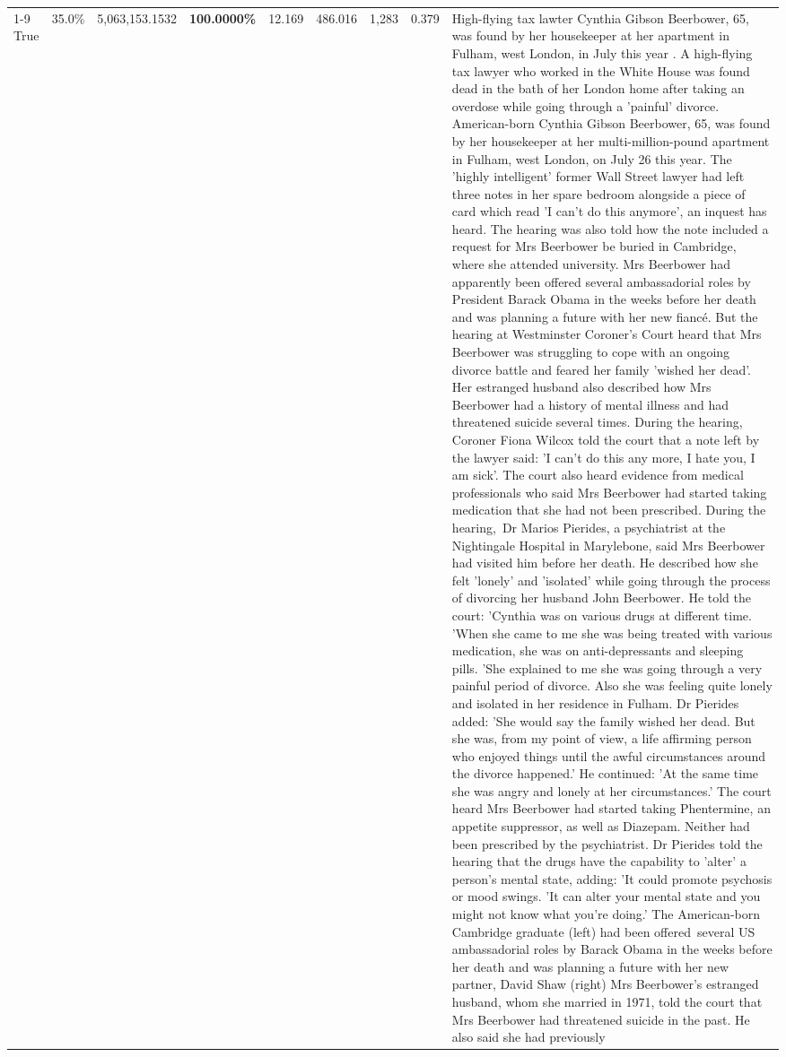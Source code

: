 \begin{table}[H]
\begin{tabular}{lllrlllll}
\cline{1-9}
True & 35.0\% & 5,063,153.1532 & \bfseries \color{red} 100.0000\% & 12.169 & 486.016 & 1,283 & 0.379 & High-flying tax lawter Cynthia Gibson Beerbower, 65, was found by her housekeeper at her apartment in Fulham, west London, in July this year . A high-flying tax lawyer who worked in the White House was found dead in the bath of her London home after taking an overdose while going through a 'painful' divorce. American-born Cynthia Gibson Beerbower, 65, was found by her housekeeper at her multi-million-pound apartment in Fulham, west London, on July 26 this year. The 'highly intelligent' former Wall Street lawyer had left three notes in her spare bedroom alongside a piece of card which read 'I can't do this anymore', an inquest has heard. The hearing was also told how the note included a request for Mrs Beerbower be buried in Cambridge, where she attended university. Mrs Beerbower had apparently been offered several ambassadorial roles by President Barack Obama in the weeks before her death and was planning a future with her new fiancé. But the hearing at Westminster Coroner's Court heard that Mrs Beerbower was struggling to cope with an ongoing divorce battle and feared her family 'wished her dead'. Her estranged husband also described how Mrs Beerbower had a history of mental illness and had threatened suicide several times. During the hearing, Coroner Fiona Wilcox told the court that a note left by the lawyer said: 'I can't do this any more, I hate you, I am sick'. The court also heard evidence from medical professionals who said Mrs Beerbower had started taking medication that she had not been prescribed. During the hearing, Dr Marios Pierides, a psychiatrist at the Nightingale Hospital in Marylebone, said Mrs Beerbower had visited him before her death. He described how she felt 'lonely' and 'isolated' while going through the process of divorcing her husband John Beerbower. He told the court: 'Cynthia was on various drugs at different time. 'When she came to me she was being treated with various medication, she was on anti-depressants and sleeping pills. 'She explained to me she was going through a very painful period of divorce. Also she was feeling quite lonely and isolated in her residence in Fulham. Dr Pierides added: 'She would say the family wished her dead. But she was, from my point of view, a life affirming person who enjoyed things until the awful circumstances around the divorce happened.' He continued: 'At the same time she was angry and lonely at her circumstances.' The court heard Mrs Beerbower had started taking Phentermine, an appetite suppressor, as well as Diazepam. Neither had been prescribed by the psychiatrist. Dr Pierides told the hearing that the drugs have the capability to 'alter' a person's mental state, adding: 'It could promote psychosis or mood swings. 'It can alter your mental state and you might not know what you're doing.' The American-born Cambridge graduate (left) had been offered several US ambassadorial roles by Barack Obama in the weeks before her death and was planning a future with her new partner, David Shaw (right) Mrs Beerbower's estranged husband, whom she married in 1971, told the court that Mrs Beerbower had threatened suicide in the past. He also said she had previously 
\end{tabular}
\end{table}
